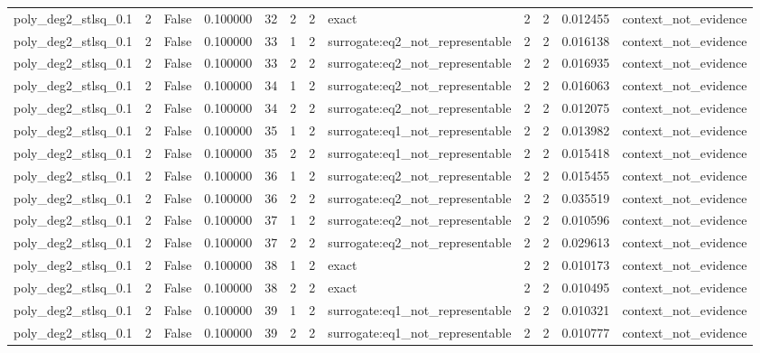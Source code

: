 \begin{tabular}{lrrrrrrlrrrl}
poly\_deg2\_stlsq\_0.1 & 2 & False & 0.100000 & 32 & 2 & 2 & exact & 2 & 2 & 0.012455 & context\_not\_evidence \\
poly\_deg2\_stlsq\_0.1 & 2 & False & 0.100000 & 33 & 1 & 2 & surrogate:eq2\_not\_representable & 2 & 2 & 0.016138 & context\_not\_evidence \\
poly\_deg2\_stlsq\_0.1 & 2 & False & 0.100000 & 33 & 2 & 2 & surrogate:eq2\_not\_representable & 2 & 2 & 0.016935 & context\_not\_evidence \\
poly\_deg2\_stlsq\_0.1 & 2 & False & 0.100000 & 34 & 1 & 2 & surrogate:eq2\_not\_representable & 2 & 2 & 0.016063 & context\_not\_evidence \\
poly\_deg2\_stlsq\_0.1 & 2 & False & 0.100000 & 34 & 2 & 2 & surrogate:eq2\_not\_representable & 2 & 2 & 0.012075 & context\_not\_evidence \\
poly\_deg2\_stlsq\_0.1 & 2 & False & 0.100000 & 35 & 1 & 2 & surrogate:eq1\_not\_representable & 2 & 2 & 0.013982 & context\_not\_evidence \\
poly\_deg2\_stlsq\_0.1 & 2 & False & 0.100000 & 35 & 2 & 2 & surrogate:eq1\_not\_representable & 2 & 2 & 0.015418 & context\_not\_evidence \\
poly\_deg2\_stlsq\_0.1 & 2 & False & 0.100000 & 36 & 1 & 2 & surrogate:eq2\_not\_representable & 2 & 2 & 0.015455 & context\_not\_evidence \\
poly\_deg2\_stlsq\_0.1 & 2 & False & 0.100000 & 36 & 2 & 2 & surrogate:eq2\_not\_representable & 2 & 2 & 0.035519 & context\_not\_evidence \\
poly\_deg2\_stlsq\_0.1 & 2 & False & 0.100000 & 37 & 1 & 2 & surrogate:eq2\_not\_representable & 2 & 2 & 0.010596 & context\_not\_evidence \\
poly\_deg2\_stlsq\_0.1 & 2 & False & 0.100000 & 37 & 2 & 2 & surrogate:eq2\_not\_representable & 2 & 2 & 0.029613 & context\_not\_evidence \\
poly\_deg2\_stlsq\_0.1 & 2 & False & 0.100000 & 38 & 1 & 2 & exact & 2 & 2 & 0.010173 & context\_not\_evidence \\
poly\_deg2\_stlsq\_0.1 & 2 & False & 0.100000 & 38 & 2 & 2 & exact & 2 & 2 & 0.010495 & context\_not\_evidence \\
poly\_deg2\_stlsq\_0.1 & 2 & False & 0.100000 & 39 & 1 & 2 & surrogate:eq1\_not\_representable & 2 & 2 & 0.010321 & context\_not\_evidence \\
poly\_deg2\_stlsq\_0.1 & 2 & False & 0.100000 & 39 & 2 & 2 & surrogate:eq1\_not\_representable & 2 & 2 & 0.010777 & context\_not\_evidence \\

\end{tabular}
